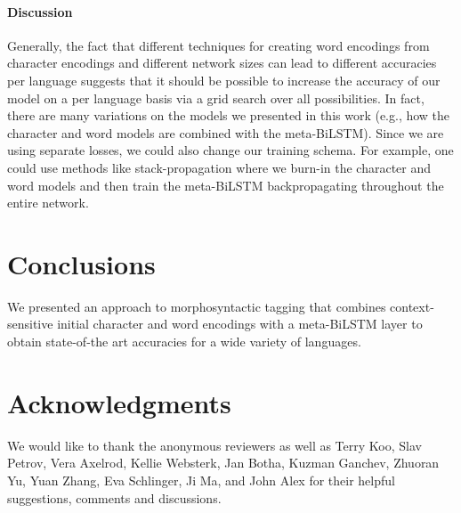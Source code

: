 \documentclass[11pt,a4paper]{article}
\begin{document}
\paragraph{Discussion}
\label{sec:discussion}

Generally, the fact that different techniques for creating word encodings from character encodings and different network sizes can lead to different accuracies per language suggests that it should be possible to increase the accuracy of our model on a per language basis via a grid search over all possibilities. 
In fact, there are many variations on the models we presented in this work (e.g., how the character and word models are combined with the meta-BiLSTM). 
Since we are using separate losses, we could also change our training schema. For example, one could use methods like stack-propagation \cite{zhang2016stack} where we burn-in the character and word models and then train the meta-BiLSTM backpropagating throughout the entire network.









\section{Conclusions}
\label{sec:conclusion}

We presented an approach to morphosyntactic tagging that combines context-sensitive initial character and word encodings with a meta-BiLSTM layer to obtain state-of-the art accuracies for a wide variety of languages.

\section*{Acknowledgments}

We would like to thank the anonymous reviewers as well as Terry Koo, Slav Petrov, Vera Axelrod, Kellie Websterk, Jan Botha, Kuzman Ganchev, Zhuoran Yu, Yuan Zhang, Eva Schlinger, Ji Ma, and John Alex for their helpful suggestions, comments and discussions.





\end{document}
